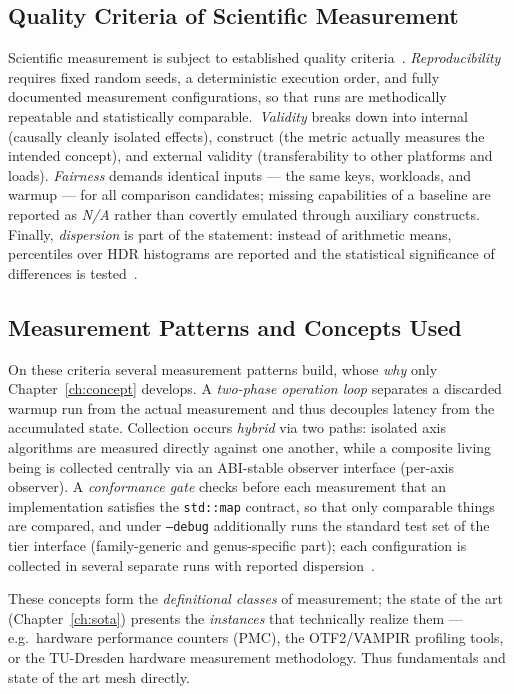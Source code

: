 \subsection{Quality Criteria of Scientific Measurement}\label{ssec:measurement-criteria}
Scientific measurement is subject to established quality criteria~\cite{hoefler2015benchmarking}.
\emph{Reproducibility} requires fixed random seeds, a deterministic execution order, and fully
documented measurement configurations, so that runs are methodically repeatable and statistically
comparable.\ \emph{Validity} breaks down into internal (causally cleanly isolated effects), construct
(the metric actually measures the intended concept), and external validity (transferability to other
platforms and loads)\@. \emph{Fairness} demands identical inputs --- the same keys, workloads, and
warmup --- for all comparison candidates; missing capabilities of a baseline are reported as
\emph{N/A} rather than covertly emulated through auxiliary constructs. Finally, \emph{dispersion} is
part of the statement: instead of arithmetic means, percentiles over HDR histograms are reported and
the statistical significance of differences is tested~\cite{hoefler2015benchmarking}.

\subsection{Measurement Patterns and Concepts Used}\label{ssec:measurement-patterns}
On these criteria several measurement patterns build, whose \emph{why} only Chapter~\ref{ch:concept}
develops. A \emph{two-phase operation loop} separates a discarded warmup run from the actual
measurement and thus decouples latency from the accumulated state. Collection occurs \emph{hybrid}
via two paths: isolated axis algorithms are measured directly against one another, while a composite
living being is collected centrally via an ABI-stable observer interface (per-axis observer). A
\emph{conformance gate} checks before each measurement that an implementation satisfies the
\texttt{std::map} contract, so that only comparable things are compared, and under \texttt{--debug}
additionally runs the standard test set of the tier interface (family-generic and genus-specific part);
each configuration is collected in several separate runs with reported
dispersion~\cite{hoefler2015benchmarking}.

These concepts form the \emph{definitional classes} of measurement; the state of the art
(Chapter~\ref{ch:sota}) presents the \emph{instances} that technically realize them ---
e.g.\ hardware performance counters (PMC), the OTF2/VAMPIR profiling tools, or the TU-Dresden
hardware measurement methodology. Thus fundamentals and state of the art mesh directly.

